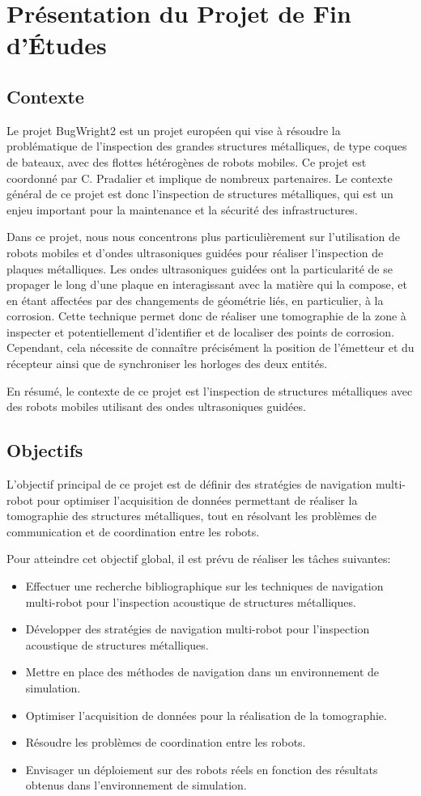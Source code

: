 \documentclass[init,francais,RandD]{rapportPFE}  %
\begin{document}
	\section{Présentation du Projet de Fin d'Études}
		\subsection{Contexte}
			Le projet BugWright2 est un projet européen qui vise à résoudre la problématique de l'inspection des grandes structures métalliques, de type coques de bateaux, avec des flottes hétérogènes de robots mobiles. Ce projet est coordonné par C. Pradalier et implique de nombreux partenaires. Le contexte général de ce projet est donc l'inspection de structures métalliques, qui est un enjeu important pour la maintenance et la sécurité des infrastructures.

			Dans ce projet, nous nous concentrons plus particulièrement sur l'utilisation de robots mobiles et d'ondes ultrasoniques guidées pour réaliser l'inspection de plaques métalliques. Les ondes ultrasoniques guidées ont la particularité de se propager le long d'une plaque en interagissant avec la matière qui la compose, et en étant affectées par des changements de géométrie liés, en particulier, à la corrosion. Cette technique permet donc de réaliser une tomographie de la zone à inspecter et potentiellement d'identifier et de localiser des points de corrosion. Cependant, cela nécessite de connaître précisément la position de l'émetteur et du récepteur ainsi que de synchroniser les horloges des deux entités.

			En résumé, le contexte de ce projet est l'inspection de structures métalliques avec des robots mobiles utilisant des ondes ultrasoniques guidées.
		\subsection{Objectifs}
			L'objectif principal de ce projet est de définir des stratégies de navigation multi-robot pour optimiser l'acquisition de données permettant de réaliser la tomographie des structures métalliques, tout en résolvant les problèmes de communication et de coordination entre les robots.

			Pour atteindre cet objectif global, il est prévu de réaliser les tâches suivantes:
			\begin{itemize}
				\item Effectuer une recherche bibliographique sur les techniques de navigation multi-robot pour l'inspection acoustique de structures métalliques.
				\item Développer des stratégies de navigation multi-robot pour l'inspection acoustique de structures métalliques.
				\item Mettre en place des méthodes de navigation dans un environnement de simulation.
				\item Optimiser l'acquisition de données pour la réalisation de la tomographie.
				\item Résoudre les problèmes de coordination entre les robots.
				\item Envisager un déploiement sur des robots réels en fonction des résultats obtenus dans l'environnement de simulation.
			\end{itemize}
\end{document}
